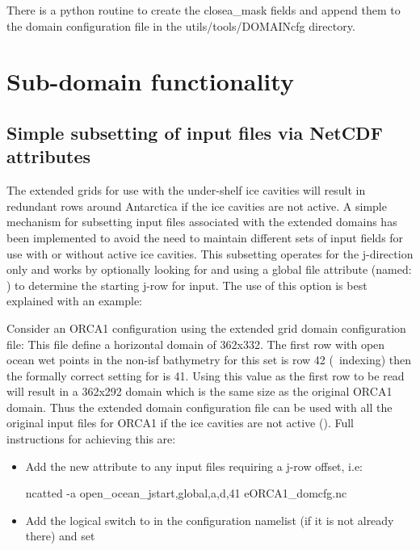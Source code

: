 \documentclass[../main/NEMO_manual]{subfiles}
\begin{document}
There is a python routine to create the closea\_mask fields and append
them to the domain configuration file in the utils/tools/DOMAINcfg directory.

\section{Sub-domain functionality}
\label{sec:MISC_zoom}

\subsection{Simple subsetting of input files via NetCDF attributes}

The extended grids for use with the under-shelf ice cavities will result in redundant rows
around Antarctica if the ice cavities are not active.  A simple mechanism for subsetting
input files associated with the extended domains has been implemented to avoid the need to
maintain different sets of input fields for use with or without active ice cavities.  This
subsetting operates for the j-direction only and works by optionally looking for and using
a global file attribute (named: ) to determine the starting j-row
for input.  The use of this option is best explained with an example:
\medskip

\noindent Consider an ORCA1
configuration using the extended grid domain configuration file: 
This file define a horizontal domain of 362x332.  The first row with
open ocean wet points in the non-isf bathymetry for this set is row 42 (\fortran\ indexing)
then the formally correct setting for  is 41.  Using this value as
the first row to be read will result in a 362x292 domain which is the same size as the
original ORCA1 domain.  Thus the extended domain configuration file can be used with all
the original input files for ORCA1 if the ice cavities are not active ().  Full instructions for achieving this are:

\begin{itemize}
\item Add the new attribute to any input files requiring a j-row offset, i.e:
\begin{cmds}
ncatted  -a open_ocean_jstart,global,a,d,41 eORCA1_domcfg.nc
\end{cmds}

\item Add the logical switch  to  in the configuration
namelist (if it is not already there) and set 
\end{itemize}
\end{document}
